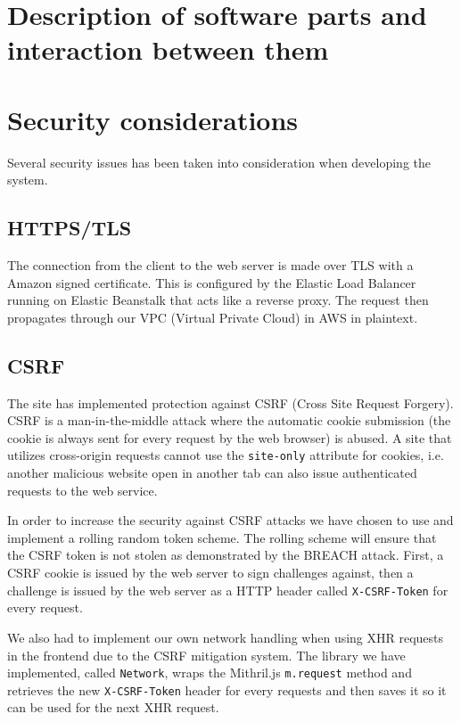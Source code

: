 \documentclass[12pt,a4paper]{report}
\begin{document}
\section{}

\chapter{Description of software parts and interaction between them}

\newpage

\chapter{Security considerations}
Several security issues has been taken into consideration when developing the system.

\section{HTTPS/TLS}
The connection from the client to the web server is made over TLS with a Amazon signed certificate.
This is configured by the Elastic Load Balancer running on Elastic Beanstalk that acts like a reverse proxy.
The request then propagates through our VPC (Virtual Private Cloud) in AWS in plaintext. 

\section{CSRF}
\label{subsec:csrf}
The site has implemented protection against CSRF (Cross Site Request Forgery). CSRF is a man-in-the-middle attack where the automatic cookie submission (the cookie is always sent for every request by the web browser) is abused. A site that utilizes cross-origin requests cannot use the \texttt{site-only} attribute for cookies, i.e. another malicious website open in another tab can also issue authenticated requests to the web service\cite{rick}.

In order to increase the security against CSRF attacks we have chosen to use and implement a rolling random token scheme. The rolling scheme will ensure that the CSRF token is not stolen as demonstrated by the BREACH attack\cite{breach}. First, a CSRF cookie is issued by the web server to sign challenges against, then a challenge is issued by the web server as a HTTP header called \texttt{X-CSRF-Token} for every request.

We also had to implement our own network handling when using XHR requests in the frontend due to the CSRF mitigation system. The library we have implemented, called \texttt{Network}\cite{roaster-network}, wraps the Mithril.js \texttt{m.request} method and retrieves the new \texttt{X-CSRF-Token} header for every requests and then saves it so it can be used for the next XHR request.
\end{document}
